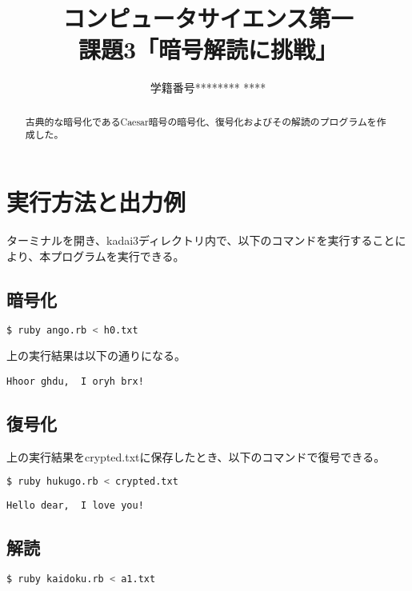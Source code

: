 \documentclass{jsarticle}
\title{コンピュータサイエンス第一\\課題3「暗号解読に挑戦」}
\author{学籍番号******** ****}
\date{}
\begin{document}
\maketitle

\begin{abstract}

古典的な暗号化であるCaesar暗号の暗号化、復号化およびその解読のプログラムを作成した。

\end{abstract}

\section{実行方法と出力例}

ターミナルを開き、kadai3ディレクトリ内で、以下のコマンドを実行することにより、本プログラムを実行できる。

\subsection{暗号化}

\begin{lstlisting}[language=sh]
$ ruby ango.rb < h0.txt
\end{lstlisting}

上の実行結果は以下の通りになる。

\begin{lstlisting}
Hhoor ghdu,  I oryh brx!
\end{lstlisting}

\subsection{復号化}

上の実行結果をcrypted.txtに保存したとき、以下のコマンドで復号できる。

\begin{lstlisting}[language=sh]
$ ruby hukugo.rb < crypted.txt
\end{lstlisting}

\begin{lstlisting}
Hello dear,  I love you!
\end{lstlisting}

\subsection{解読}

\begin{lstlisting}[language=sh]
$ ruby kaidoku.rb < a1.txt
\end{lstlisting}
\end{document}
